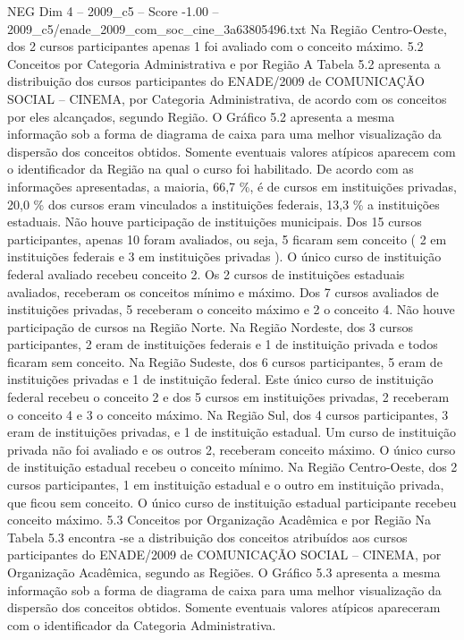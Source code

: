 \begin{textsample}{NEG Dim 4 – 2009\_c5 – Score -1.00 – 2009\_c5/enade\_2009\_com\_soc\_cine\_3a63805496.txt}
Na Região Centro-Oeste, dos 2 cursos participantes apenas 1 foi avaliado com o conceito máximo. 5.2 Conceitos por Categoria Administrativa e por Região A Tabela 5.2 apresenta a distribuição dos cursos participantes do ENADE/2009 de COMUNICAÇÃO SOCIAL – CINEMA, por Categoria Administrativa, de acordo com os conceitos por eles alcançados, segundo Região.
O Gráfico 5.2 apresenta a mesma informação sob a forma de diagrama de caixa para uma melhor visualização da dispersão dos conceitos obtidos.
Somente eventuais valores atípicos aparecem com o identificador da Região na qual o curso foi habilitado.
De acordo com as informações apresentadas, a maioria, 66,7 \%, é de cursos em instituições privadas, 20,0 \% dos cursos eram vinculados a instituições federais, 13,3 \% a instituições estaduais.
Não houve participação de instituições municipais.
Dos 15 cursos participantes, apenas 10 foram avaliados, ou seja, 5 ficaram sem conceito ( 2 em instituições federais e 3 em instituições privadas ).
O único curso de instituição federal avaliado recebeu conceito 2.
Os 2 cursos de instituições estaduais avaliados, receberam os conceitos mínimo e máximo.
Dos 7 cursos avaliados de instituições privadas, 5 receberam o conceito máximo e 2 o conceito 4.
Não houve participação de cursos na Região Norte.
Na Região Nordeste, dos 3 cursos participantes, 2 eram de instituições federais e 1 de instituição privada e todos ficaram sem conceito.
Na Região Sudeste, dos 6 cursos participantes, 5 eram de instituições privadas e 1 de instituição federal.
Este único curso de instituição federal recebeu o conceito 2 e dos 5 cursos em instituições privadas, 2 receberam o conceito 4 e 3 o conceito máximo.
Na Região Sul, dos 4 cursos participantes, 3 eram de instituições privadas, e 1 de instituição estadual.
Um curso de instituição privada não foi avaliado e os outros 2, receberam conceito máximo.
O único curso de instituição estadual recebeu o conceito mínimo.
Na Região Centro-Oeste, dos 2 cursos participantes, 1 em instituição estadual e o outro em instituição privada, que ficou sem conceito.
O único curso de instituição estadual participante recebeu conceito máximo. 5.3 Conceitos por Organização Acadêmica e por Região Na Tabela 5.3 encontra -se a distribuição dos conceitos atribuídos aos cursos participantes do ENADE/2009 de COMUNICAÇÃO SOCIAL – CINEMA, por Organização Acadêmica, segundo as Regiões.
O Gráfico 5.3 apresenta a mesma informação sob a forma de diagrama de caixa para uma melhor visualização da dispersão dos conceitos obtidos.
Somente eventuais valores atípicos apareceram com o identificador da Categoria Administrativa.

\end{textsample}

